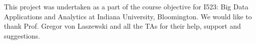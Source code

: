 \documentclass[sigconf]{acmart}
\begin{document}
\begin{acks}
This project was undertaken as a part of the course objective for I523: Big Data Applications and Analytics at Indiana
University, Bloomington. We would like to thank Prof. Gregor
von Laszewski and all the TAs for their help, support and suggestions. 

\end{acks}


 
\end{document}
